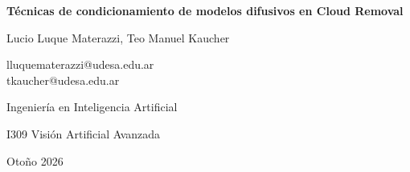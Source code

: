 \begin{center}
    \vspace*{0.5cm}
    {\Huge\textbf{Técnicas de condicionamiento de modelos difusivos en Cloud Removal}}
    
    \vspace{0.2cm}
    
    {\Large Lucio Luque Materazzi, Teo Manuel Kaucher}

    \vspace{0.3cm}
    
    {\Large lluquematerazzi@udesa.edu.ar \\ tkaucher@udesa.edu.ar}

    \vspace{0.3 cm}

    {\Large Ingeniería en Inteligencia Artificial}

    \Large I309 Visión Artificial Avanzada
    
    \vspace{0.5cm}

    Otoño 2026
    
    \vspace{0.5cm}

    \begin{abstract}
    En este trabajo se estudió el problema de \textit{cloud removal} sobre SEN12MS-CR, un dataset multimodal de imágenes satelitales que provee, para cada muestra, una imagen SAR, una imagen óptica nublada y su correspondiente imagen óptica libre de nubes. El objetivo principal fue analizar qué formulación difusiva resulta más adecuada para la tarea de reconstrucción y en qué medida la incorporación de información SAR mejora el resultado, evaluando distintas estrategias de fusión multimodal. Para ello se implementaron varias arquitecturas sobre una misma base U-Net, comparando la metodología clásica de un modelo difusivo, que parte de ruido gaussiano puro, con variantes que la reemplazan por un puente de difusión entre la imagen nublada y la limpia. Sobre esta última formulación se evaluaron además tres formas de introducir la información SAR: concatenación directa en la entrada, una rama auxiliar tipo ControlNet y bloques de fusión por atención cruzada mediante SARF Blocks.

    \end{abstract}


    \vspace{0.15cm}
      
\end{center}